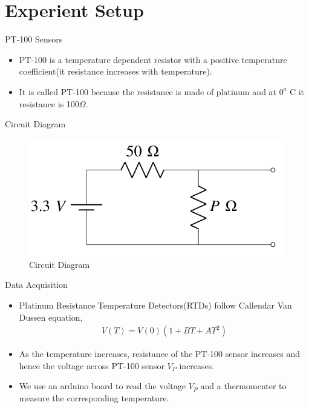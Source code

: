 \documentclass{beamer}
\providecommand{\brak}[1]{\ensuremath{\left(#1\right)}}
\theoremstyle{remark}
\begin{document}
\section{Experient Setup}
\begin{frame}{PT-100 Sensors}
	\begin{itemize}
		\item PT-100 is a temperature dependent resistor with a positive temperature coefficient(it resistance increases with temperature).
		\item It is called PT-100 because the resistance is made of platinum and at $0^{o}$ C it resistance is 100$\Omega$.
	\end{itemize}
\end{frame}
\begin{frame}{Circuit Diagram}
	\begin{figure}[!ht]
    \centering
    \includegraphics[width=0.6\columnwidth]{figs/Circuit Diagram.png}
    \caption{Circuit Diagram}
    \label{fig:Circuit}
	\end{figure}
\end{frame}
\begin{frame}{Data Acquisition}
	\begin{itemize}
		\item Platinum Resistance Temperature Detectors(RTDs) follow Callendar Van Dussen equation,
		\begin{align}
			V(T) = V(0)\brak{1+BT+AT^2}
		\end{align} 
		\item As the temperature increases, resistance of the PT-100 sensor increases and hence the voltage across PT-100 sensor $V_P$ increases.
		\item We use an arduino board to read the voltage $V_P$ and a thermomenter to measure the corresponding temperature.
	\end{itemize}
\end{frame}
\end{document}
